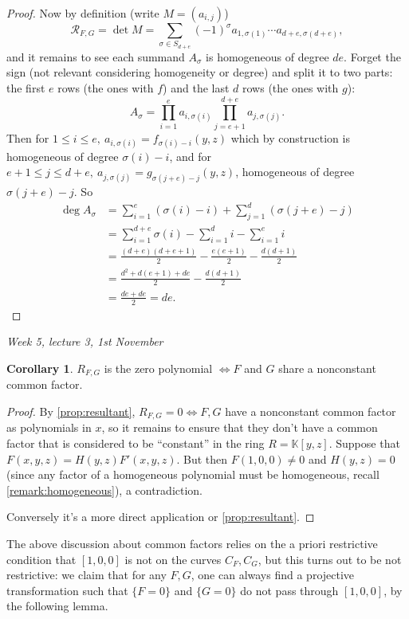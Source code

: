 \documentclass{article}
\newcommand{\K}{\mathbb{K}}
\newcommand{\re}{\mathcal{R}}
\theoremstyle{definition}
\newtheorem{coro}[defn]{Corollary}
\begin{document}
\begin{proof}
Now by definition (write $M=(a_{i,j})$)
\[
\re_{F,G}=\det M=\sum_{\sigma\in S_{d+e}}(-1)^\sigma a_{1,\sigma(1)}\cdots a_{d+e,\sigma(d+e)},
\]
and it remains to see each summand $A_\sigma$ is homogeneous of degree $de$. Forget the sign (not relevant considering homogeneity or degree) and split it to two parts: the first $e$ rows (the ones with $f$) and the last $d$ rows (the ones with $g$):
\[
A_\sigma=\prod_{i=1}^e a_{i,\sigma(i)}\prod_{j=e+1}^{d+e} a_{j,\sigma(j)}.
\]
Then for $1\leq i\leq e,\ a_{i,\sigma(i)}=f_{\sigma(i)-i}(y,z)$ which by construction is homogeneous of degree $\sigma(i)-i$, and for $e+1\leq j\leq d+e,\ a_{j,\sigma(j)}=g_{\sigma(j+e)-j}(y,z)$, homogeneous of degree $\sigma(j+e)-j$. So
\[
\begin{aligned}
\deg A_\sigma&=\sum_{i=1}^e (\sigma(i)-i)+\sum_{j=1}^d (\sigma(j+e)-j) \\
&=\sum_{i=1}^{d+e}\sigma(i)-\sum_{i=1}^d i-\sum_{i=1}^e i \\
&=\frac{(d+e)(d+e+1)}{2}-\frac{e(e+1)}{2}-\frac{d(d+1)}{2} \\
&=\frac{d^2+d(e+1)+de}{2}-\frac{d(d+1)}{2} \\
&=\frac{de+de}{2}=de.
\end{aligned}
\]
\end{proof}

\begin{flushright}
\textit{Week 5, lecture 3, 1st November}
\end{flushright}

\begin{coro}
$R_{F,G}$ is the zero polynomial $\iff F$ and $G$ share a nonconstant common factor.
\end{coro}
\begin{proof}
By \ref{prop:resultant}, $R_{F,G}=0\iff F,G$ have a nonconstant common factor as polynomials in $x$, so it remains to ensure that they don't have a common factor that is considered to be ``constant'' in the ring $R=\K[y,z]$. Suppose that $F(x,y,z)=H(y,z)F'(x,y,z)$. But then $F(1,0,0)\neq 0$ and $H(y,z)=0$ (since any factor of a homogeneous polynomial must be homogeneous, recall \ref{remark:homogeneous}), a contradiction.

Conversely it's a more direct application or \ref{prop:resultant}.
\end{proof}

The above discussion about common factors relies on the a priori restrictive condition that $[1,0,0]$ is not on the curves $C_F,C_G$, but this turns out to be not restrictive: we claim that for any $F,G$, one can always find a projective transformation such that $\{F=0\}$ and $\{G=0\}$ do not pass through $[1,0,0]$, by the following lemma.
\end{document}
